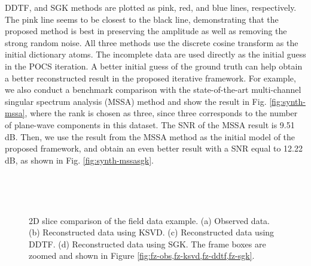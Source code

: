 DDTF, and SGK methods are plotted as pink, red, and blue lines, respectively. The pink line seems to be closest to the black line, demonstrating that the proposed method is best in preserving the amplitude as well as removing the strong random noise. All three methods use the discrete cosine transform as the initial dictionary atoms. The incomplete data are used directly as the initial guess in the POCS iteration. A better initial guess of the ground truth can help obtain a better reconstructed result in the proposed iterative framework. For example, we also conduct a benchmark comparison with the state-of-the-art multi-channel singular spectrum analysis (MSSA) method and show the result in Fig. \ref{fig:synth-mssa}, where the rank is chosen as three, since three corresponds to the number of plane-wave components in this dataset. The SNR of the MSSA result is 9.51 dB. Then, we use the result from the MSSA method as the initial model of the proposed framework, and obtain an even better result with a SNR equal to 12.22 dB, as shown in Fig. \ref{fig:synth-mssasgk}. 



\begin{figure}[htb!]
\centering
{}
\\
\caption{ }
\label{fig:f-obs,f-ksvd,f-ddtf,f-sgk}
\end{figure}

\begin{figure}[htb!]
\centering
{}
\\
\caption{2D slice comparison of the field data example. (a) Observed data. (b) Reconstructed data using KSVD. (c) Reconstructed data using DDTF. (d) Reconstructed data using SGK. The frame boxes are zoomed and shown in Figure \ref{fig:fz-obs,fz-ksvd,fz-ddtf,fz-sgk}. }
\label{fig:f-s-obs0,f-s-ksvd0,f-s-ddtf0,f-s-sgk0}
\end{figure}


